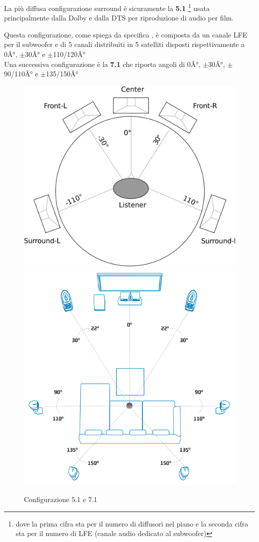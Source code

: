 \documentclass[12pt,a4paper]{report}
\begin{document}
La più diffusa configurazione surround è sicuramente la \textbf{5.1} \footnote{dove la prima cifra sta per il numero di diffusori nel piano e la seconda cifra sta per il numero di LFE (canale audio dedicato al subwoofer)} usata principalmente dalla Dolby e dalla DTS per riproduzione di audio per film.


Questa configurazione, come spiega da specifica \cite{5.1}, è composta da un canale LFE per il subwoofer e di 5 canali distribuiti in 5 satelliti disposti rispettivamente a 0Â°, $\pm$30Â° e $\pm$110/120Â°\\

Una successiva configurazione è la \textbf{7.1} che riporta angoli di 0Â°, $\pm$30Â°, $\pm$90/110Â° e $\pm$135/150Â°

\begin{figure}[htbp]
	\centering
	\includegraphics[scale=0.18]{figures/5-1.png}\includegraphics[scale=0.34]{figures/7-1.png}
	\caption {Configurazione 5.1 e 7.1} 
	\label{fig:5.1}
	\end{figure}
  
\end{document}
